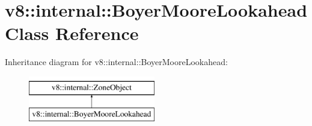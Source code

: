 \hypertarget{classv8_1_1internal_1_1BoyerMooreLookahead}{}\section{v8\+:\+:internal\+:\+:Boyer\+Moore\+Lookahead Class Reference}
\label{classv8_1_1internal_1_1BoyerMooreLookahead}
Inheritance diagram for v8\+:\+:internal\+:\+:Boyer\+Moore\+Lookahead\+:\begin{figure}[H]
\begin{center}
\leavevmode
\includegraphics[height=2.000000cm]{classv8_1_1internal_1_1BoyerMooreLookahead}
\end{center}
\end{figure}
